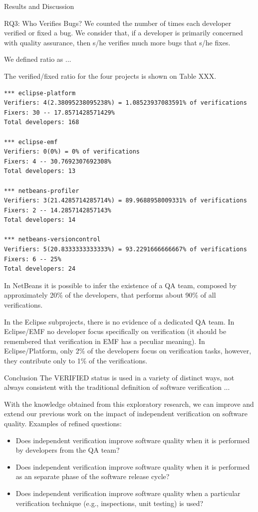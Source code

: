 \begin{section}{Results and Discussion}
\begin{subsection}{RQ3: Who Verifies Bugs?}
	We counted the number of times each developer verified or fixed a bug. We consider that, if a developer is primarily concerned with quality assurance, then s/he verifies much more bugs that s/he fixes.
	
	We defined ratio as ...
	
	The verified/fixed ratio for the four projects is shown on Table XXX.
	
\begin{verbatim}
*** eclipse-platform 
Verifiers: 4(2.38095238095238%) = 1.08523937083591% of verifications
Fixers: 30 -- 17.8571428571429%
Total developers: 168 

*** eclipse-emf 
Verifiers: 0(0%) = 0% of verifications
Fixers: 4 -- 30.7692307692308%
Total developers: 13 

*** netbeans-profiler 
Verifiers: 3(21.4285714285714%) = 89.9688958009331% of verifications
Fixers: 2 -- 14.2857142857143%
Total developers: 14 

*** netbeans-versioncontrol 
Verifiers: 5(20.8333333333333%) = 93.2291666666667% of verifications
Fixers: 6 -- 25%
Total developers: 24
\end{verbatim}
	
	In NetBeans it is possible to infer the existence of a QA team, composed by approximately 20\% of the developers, that performs about 90\% of all verifications.
	
	In the Eclipse subprojects, there is no evidence of a dedicated QA team. In Eclipse/EMF no developer focus specifically on verification (it should be remembered that verification in EMF has a peculiar meaning). In Eclipse/Platform, only 2\% of the developers focus on verification tasks, however, they contribute only to 1\% of the verifications.
	
\end{subsection}

\end{section}

\begin{section}{Conclusion}
  The VERIFIED status is used in a variety of distinct ways, not always consistent with the traditional definition of software verification ...
	
	With the knowledge obtained from this exploratory research, we can improve and extend our previous work on the impact of independent verification on software quality. Examples of refined questions:
	
	\begin{itemize}
		\item Does independent verification improve software quality when it is performed by developers from the QA team?
		\item Does independent verification improve software quality when it is performed as an separate phase of the software release cycle?
		\item Does independent verification improve software quality when a particular verification technique (e.g., inspections, unit testing) is used?
	\end{itemize}
	
\end{section}

